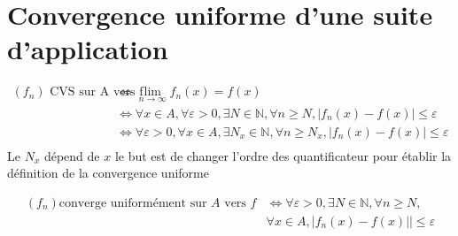 \documentclass[11pt,hidelinks]{book}
\theoremstyle{mytheoremstyle}
\theoremstyle{mytheoremstyle}
\theoremstyle{mytheoremstyle}
\theoremstyle{mytheoremstyle}
\theoremstyle{mytheoremstyle}
\theoremstyle{mytheoremstyle}
\theoremstyle{mytheoremstyle}
\theoremstyle{mytheoremstyle}
\theoremstyle{myproblemstyle}
\def\mbb#1{\mathbb{#1}}
\def\bN{\mbb{N}}
\def\ln{\lim_{n \to \infty}}
\newcommand{\cvu}[2]{converge uniformément sur $#1$ vers $#2$}
\begin{document}
\section{Convergence uniforme d'une suite d'application}
\begin{adjustwidth}{-2em}{-1em}
\begin{prop}
    \begin{align*}
        (f_n) \text{ CVS sur A vers f} & \Leftrightarrow \ln f_n(x) = f(x)\\
                                     & \Leftrightarrow \forall x \in A, \forall \varepsilon > 0,  \exists N \in \bN, \forall n \geq N, \left| f_n(x) - f(x) \right| \leq \varepsilon  \\
                                     & \Leftrightarrow  \forall \varepsilon > 0, \forall x \in A, \exists N_{x} \in \bN, \forall n \geq N_{x}, \left| f_n(x) - f(x) \right| \leq \varepsilon \\
                                    \end{align*}
    Le $N_{x}$ dépend de $x$ le but est de changer l'ordre des quantificateur pour établir la définition de la convergence uniforme
\end{prop}
\end{adjustwidth}
\begin{definition}
        \begin{align*}
        (f_n) \text{\cvu{A}{f}} &\Leftrightarrow \forall \varepsilon > 0, \exists N \in \bN, \forall n \geq N,   \\  
                                & \forall x \in A, \left| f_n(x) - f(x) |\right| \leq \varepsilon \\
    \end{align*}
    \end{definition}
\end{document}
